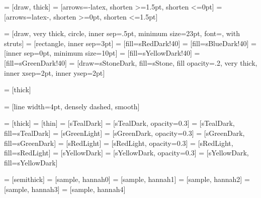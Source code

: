  = [draw, thick]
 = [arrows={-latex}, shorten >=1.5pt, shorten <=0pt]
 = [arrows={latex-}, shorten >=0pt, shorten <=1.5pt]

 = [draw, very thick, circle, inner sep=.5pt, minimum size=23pt, font=\small, with struts]
 = [rectangle, inner sep=3pt]
 = [fill=sRedDark!40]
 = [fill=sBlueDark!40]
 = [inner sep=0pt, minimum size=10pt]
 = [fill=sYellowDark!40]
 = [fill=sGreenDark!40]
 = [draw=sStoneDark, fill=sStone, fill opacity=.2, very thick, inner xsep=2pt, inner ysep=2pt]




 = [thick]


 = [line width=4pt, densely dashed, smooth]


 = [thick]
 = [thin]
 = [sTealDark]
 = [sTealDark, opacity=0.3]
 = [sTealDark, fill=sTealDark]
 = [sGreenLight]
 = [sGreenDark, opacity=0.3]
 = [sGreenDark, fill=sGreenDark]
 = [sRedLight]
 = [sRedLight, opacity=0.3]
 = [sRedLight, fill=sRedLight]
 = [sYellowDark]
 = [sYellowDark, opacity=0.3]
 = [sYellowDark, fill=sYellowDark]

 = [semithick]
 = [sample, hannah0]
 = [sample, hannah1]
 = [sample, hannah2]
 = [sample, hannah3]
 = [sample, hannah4]
